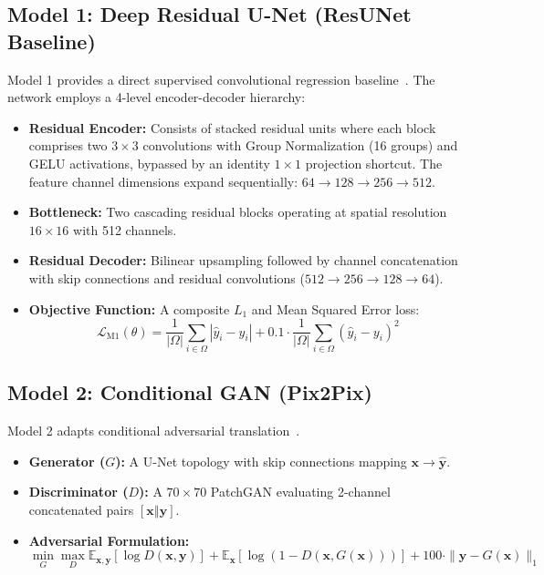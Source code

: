 \subsection{Model 1: Deep Residual U-Net (ResUNet Baseline)}
Model 1 provides a direct supervised convolutional regression baseline~\cite{zhang2018road}. The network employs a 4-level encoder-decoder hierarchy:
\begin{itemize}
    \item \textbf{Residual Encoder:} Consists of stacked residual units where each block comprises two $3\times3$ convolutions with Group Normalization (16 groups) and GELU activations, bypassed by an identity $1\times1$ projection shortcut. The feature channel dimensions expand sequentially: $64 \to 128 \to 256 \to 512$.
    \item \textbf{Bottleneck:} Two cascading residual blocks operating at spatial resolution $16 \times 16$ with 512 channels.
    \item \textbf{Residual Decoder:} Bilinear upsampling followed by channel concatenation with skip connections and residual convolutions ($512 \to 256 \to 128 \to 64$).
    \item \textbf{Objective Function:} A composite $L_1$ and Mean Squared Error loss:
    \begin{equation}
    \mathcal{L}_{\text{M1}}(\theta) = \frac{1}{|\Omega|} \sum_{i \in \Omega} |\hat{y}_i - y_i| + 0.1 \cdot \frac{1}{|\Omega|} \sum_{i \in \Omega} (\hat{y}_i - y_i)^2
    \label{eq:m1_detailed_loss}
    \end{equation}
\end{itemize}

\subsection{Model 2: Conditional GAN (Pix2Pix)}
Model 2 adapts conditional adversarial translation~\cite{isola2017image,nie2017medical}.
\begin{itemize}
    \item \textbf{Generator ($G$):} A U-Net topology with skip connections mapping $\mathbf{x} \to \mathbf{\hat{y}}$.
    \item \textbf{Discriminator ($D$):} A $70 \times 70$ PatchGAN evaluating 2-channel concatenated pairs $[\mathbf{x} \mathbin{\Vert} \mathbf{y}]$.
    \item \textbf{Adversarial Formulation:}
    \begin{equation}
    \min_G \max_D \mathbb{E}_{\mathbf{x}, \mathbf{y}}[\log D(\mathbf{x}, \mathbf{y})] + \mathbb{E}_{\mathbf{x}}[\log(1 - D(\mathbf{x}, G(\mathbf{x})))] + 100 \cdot \|\mathbf{y} - G(\mathbf{x})\|_1
    \label{eq:m2_detailed_loss}
    \end{equation}
\end{itemize}

